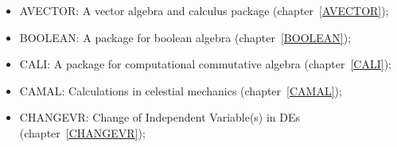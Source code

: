 \begin{itemize}
\item
{AVECTOR: A vector algebra and calculus package}
(chapter~\ref{AVECTOR}); 

\item
{BOOLEAN: A package for boolean algebra} (chapter~\ref{BOOLEAN});

\item
{CALI: A package for computational commutative algebra}
(chapter~\ref{CALI});

\item
{CAMAL: Calculations in celestial mechanics} (chapter~\ref{CAMAL});

\item
{CHANGEVR: Change of Independent Variable(s) in DEs}
(chapter~\ref{CHANGEVR}); 


\end{itemize}

